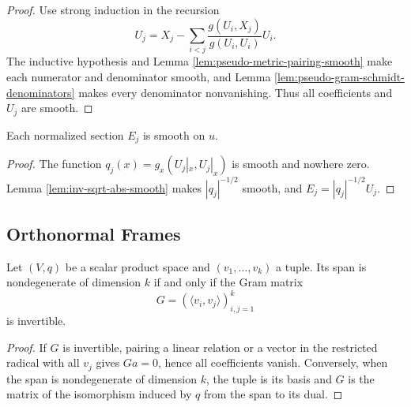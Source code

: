 \begin{proof}

\sketch Use strong induction in the recursion
\[
U_j=X_j-\sum_{i<j}
\frac{g(U_i,X_j)}{g(U_i,U_i)}U_i.
\]
The inductive hypothesis and Lemma \ref{lem:pseudo-metric-pairing-smooth} make
each numerator and denominator smooth, and Lemma
\ref{lem:pseudo-gram-schmidt-denominators} makes every denominator nonvanishing.
Thus all coefficients and $U_j$ are smooth.
\end{proof}

\begin{proposition}
\label{prop:pseudo-gram-schmidt-frame-smooth}





Each normalized section $E_j$ is smooth on $u$.
\end{proposition}

\begin{proof}

\sketch The function $q_j(x)=g_x(U_j|_x,U_j|_x)$ is smooth and nowhere zero.
Lemma \ref{lem:inv-sqrt-abs-smooth} makes $|q_j|^{-1/2}$ smooth, and
$E_j=|q_j|^{-1/2}U_j$.
\end{proof}

\subsection{Orthonormal Frames}

\begin{lemma}
\label{lem:nondegenerate-tuple-gram-matrix}





Let $(V,q)$ be a scalar product space and $(v_1,\ldots,v_k)$ a tuple. Its span
is nondegenerate of dimension $k$ if and only if the Gram matrix
\[
G=(\langle v_i,v_j\rangle)_{i,j=1}^k
\]
is invertible.
\end{lemma}

\begin{proof}

\sketch If $G$ is invertible, pairing a linear relation or a vector in the
restricted radical with all $v_j$ gives $Ga=0$, hence all coefficients vanish.
Conversely, when the span is nondegenerate of dimension $k$, the tuple is its
basis and $G$ is the matrix of the isomorphism induced by $q$ from the span to
its dual.
\end{proof}

